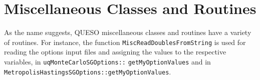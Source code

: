% 

\section{Miscellaneous Classes and Routines}
 
As the name suggests, QUESO miscellaneous classes and routines have a variety of routines.
For instance, the function \verb+MiscReadDoublesFromString+ is used for reading the options input files and assigning the values to the respective variables, in \texttt{uqMonteCarloSGOptions::} \texttt{getMyOptionValues} and in \verb+MetropolisHastingsSGOptions::getMyOptionValues+. 

